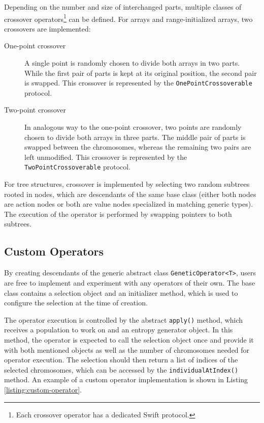 Depending on the number and size of interchanged parts, multiple classes of crossover operators\footnote{Each crossover operator has a dedicated Swift protocol.} can be defined. For arrays and range-initialized arrays, two crossovers are implemented:
~
\begin{description}
	\item[One-point crossover]
	A single point is randomly chosen to divide both arrays in two parts. While the first pair of parts is kept at its original position, the second pair is swapped. This crossover is represented by the \texttt{OnePointCrossoverable} protocol.

	\item[Two-point crossover]
	In analogous way to the one-point crossover, two points are randomly chosen to divide both arrays in three parts. The middle pair of parts is swapped between the chromosomes, whereas the remaining two pairs are left unmodified. This crossover is represented by the \texttt{TwoPointCrossoverable} protocol.
\end{description}

For tree structures, crossover is implemented by selecting two random subtrees rooted in nodes, which are descendants of the same base class (either both nodes are action nodes or both are value nodes specialized in matching generic types). The execution of the operator is performed by swapping pointers to both subtrees.

\subsection{Custom Operators}\label{section:custom-operators}
By creating descendants of the generic abstract class \texttt{GeneticOperator<T>}, users are free to implement and experiment with any operators of their own. The base class contains a selection object and an initializer method, which is used to configure the selection at the time of creation.

The operator execution is controlled by the abstract \texttt{apply()} method, which receives a population to work on and an entropy generator object. In this method, the operator is expected to call the selection object once and provide it with both mentioned objects as well as the number of chromosomes needed for operator execution. The selection should then return a list of indices of the selected chromosomes, which can be accessed by the \texttt{individualAtIndex()} method. An example of a custom operator implementation is shown in Listing \ref{listing:custom-operator}.


